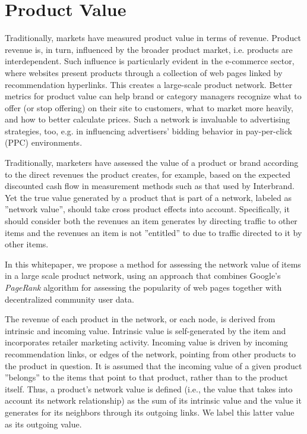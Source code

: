 \newcommand{\keyword}[1]{\textbf{#1}}
\newcommand{\tabhead}[1]{\textbf{#1}}
\newcommand{\code}[1]{\texttt{#1}}
\newcommand{\file}[1]{\texttt{\bfseries#1}}
\newcommand{\option}[1]{\texttt{\itshape#1}}


\section{Product Value}

Traditionally, markets have measured product value in terms of revenue. Product revenue is, in turn, influenced by the broader product market, i.e. products are interdependent. Such influence is particularly evident in the e-commerce sector, where websites present products through a collection of web pages linked by recommendation hyperlinks. This creates a large-scale product network. Better metrics for product value can help brand or category managers recognize what to offer (or stop offering) on their site to customers, what to market more heavily, and how to better calculate prices. Such a network is invaluable to advertising strategies, too, e.g. in influencing advertisers’ bidding behavior in pay-per-click (PPC) environments.

Traditionally, marketers have assessed the value of a product or brand according to the direct revenues the product creates, for example, based on the expected discounted cash flow in measurement methods such as that used by Interbrand. Yet the true value generated by a product that is part of a network, labeled as ”network value”, should take cross product effects into account. Specifically, it should consider both the revenues an item generates by directing traffic to other items and the revenues an item is not ”entitled” to due to traffic directed to it by other items.

In this whitepaper, we propose a method for assessing the network value of items in a large scale product network, using an approach that combines Google's \textit{PageRank} algorithm for assessing the popularity of web pages together with decentralized community user data.

The revenue of each product in the network, or each node, is derived from intrinsic and incoming value. Intrinsic value is self-generated by the item and incorporates retailer marketing activity. Incoming value is driven by incoming recommendation links, or edges of the network, pointing from other products to the product in question. It is assumed that the incoming value of a given product ”belongs” to the items that point to that product, rather than to the product itself. Thus, a product’s network value is defined (i.e., the value that takes into account its network relationship) as the sum of its intrinsic value and the value it generates for its neighbors through its outgoing links. We label this latter value as its outgoing value.

